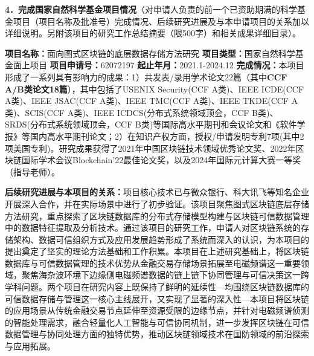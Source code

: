 \vspace{0.3cm}

{\sihao \kaishu \color{MsBlue}
\textbf{4．完成国家自然科学基金项目情况}（对申请人负责的前一个已资助期满的科学基金项目（项目名称及批准号）完成情况、后续研究进展及与本申请项目的关系加以详细说明。另附该项目的研究工作总结摘要（限500字）和相关成果详细目录）。
}

\textbf{项目名称：}面向图式区块链的底层数据存储方法研究 \newline
\indent
\textbf{项目类型：}国家自然科学基金面上项目 \newline
\indent
\textbf{项目申请号：}62072197 \newline
\indent
\textbf{起止年月：}2021.1-2024.12 \newline
\indent
\textbf{完成情况：}本项目形成了一系列具有影响力的成果：1）共发表/录用学术论文22篇（其中\textbf{CCF A/B类论文18篇}），其中包括了USENIX Security(CCF A类)、IEEE ICDE(CCF A类)、IEEE JSAC(CCF A类)、IEEE TMC(CCF A类)、IEEE TKDE(CCF A类)、SCIS(CCF A类)、IEEE ICDCS(分布式系统领域顶会，CCF B类)、SRDS(分布式系统领域顶会，CCF B类)等国际高水平期刊和会议论文和《软件学报》等国内高水平期刊论文；2）在知识产权方面，授权/申请发明专利7项(其中2项美国专利)。研究成果获得了2021年中国区块链技术领域优秀论文奖、2022年区块链国际学术会议Blockchain'22最佳论文奖，以及2024年国际元计算大赛一等奖（指导老师）。

\textbf{后续研究进展与本项目的关系：}项目核心技术已与微众银行、科大讯飞等知名企业开展深入合作，并在实际场景中进行了初步验证。该项目聚焦图式区块链底层存储方法研究，重点探索了区块链数据库的分布式存储模型构建与区块链可信数据管理中的数据特征提取及分析技术。通过该项目的研究工作，申请人对区块链系统的存储架构、数据可信组织方式及应用发展趋势形成了系统而深入的认识，为本项目的提出奠定了坚实的理论方法基础和工作积累。本项目在上述研究基础上，将区块链数据库与可信数据管理的技术优势从金融交易存储场景拓展至电磁频谱这一重要领域，聚焦海杂波环境下边缘侧电磁频谱数据的链上链下协同管理与可信决策这一跨学科问题。两个项目在研究内容上既保持了鲜明的延续性—均围绕区块链数据库的可信数据存储与管理这一核心主线展开，又实现了显著的深入性—本项目将区块链的应用场景从传统金融交易节点延伸至资源受限的边缘节点，并针对电磁频谱侦测的智能处理需求，融合轻量化人工智能与可信协同机制，进一步发挥区块链在可信数据管理与协同处理方面的独特优势，推动区块链领域技术在国防领域的前沿探索与应用拓展。



